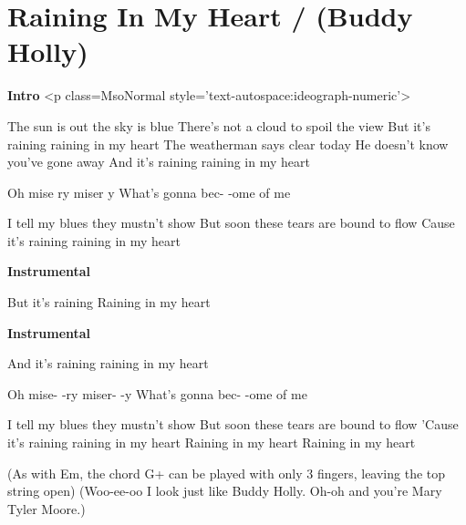 \section{Raining In My Heart / (Buddy Holly)}\label{sec:raining_in_my_heart}
\textbf{Intro}
<p class=MsoNormal style='text-autospace:ideograph-numeric'>

The sun is out the sky is blue
There's not a cloud to spoil the view
But it's raining raining in my heart 
The weatherman says clear today
He doesn't know you've gone away
And it's raining raining in my heart 

Oh mise ry miser y 
What's gonna bec- -ome of me 

I tell my blues they mustn't show
But soon these tears are bound to flow
Cause it's raining raining in my heart 

\textbf{Instrumental}

But it's raining
Raining in my heart 

\textbf{Instrumental}

And it's raining
raining in my heart 

Oh mise- -ry miser- -y 
What's gonna bec- -ome of me 

I tell my blues they mustn't show
But soon these tears are bound to flow
'Cause it's raining raining in my heart 
Raining in my heart 
Raining in my heart 

{\small (As with Em, the chord G+ can be played with only 3 fingers, leaving the
top string open)}
{\tiny (Woo-ee-oo I look just like Buddy Holly. Oh-oh and you're Mary Tyler
Moore.)}
